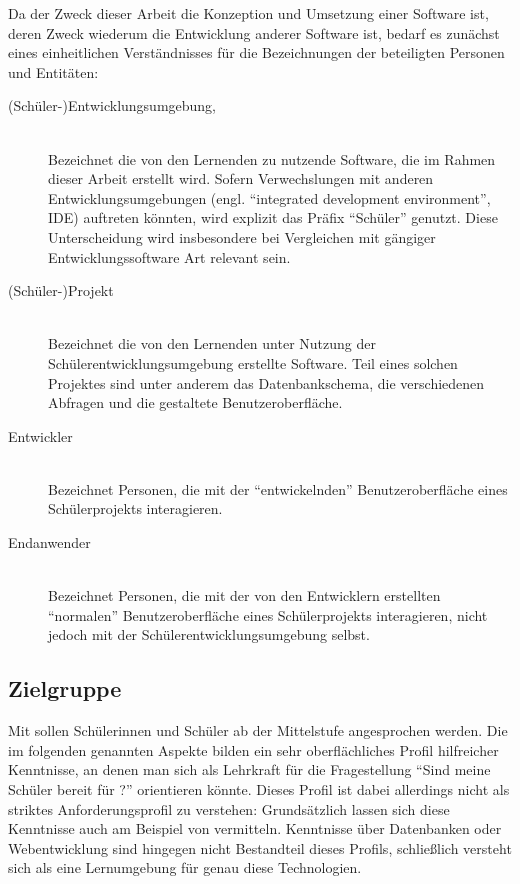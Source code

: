 Da der Zweck dieser Arbeit die Konzeption und Umsetzung einer Software ist, deren Zweck wiederum die Entwicklung anderer Software ist, bedarf es zunächst eines einheitlichen Verständnisses für die Bezeichnungen der beteiligten Personen und Entitäten:

\begin{description}
\item[(Schüler-)Entwicklungsumgebung, \idename{}] \hfill\\
  Bezeichnet die von den Lernenden zu nutzende Software, die im Rahmen dieser Arbeit erstellt wird. Sofern Verwechslungen mit anderen Entwicklungsumgebungen (engl. ``integrated development environment'', IDE) auftreten könnten, wird explizit das Präfix ``Schüler'' genutzt. Diese Unterscheidung wird insbesondere bei Vergleichen mit gängiger Entwicklungssoftware Art relevant sein.
\item[(Schüler-)Projekt] \hfill\\
  Bezeichnet die von den Lernenden unter Nutzung der Schülerentwicklungsumgebung erstellte Software. Teil eines solchen Projektes sind unter anderem das Datenbankschema, die verschiedenen Abfragen und die gestaltete Benutzeroberfläche.
\item[Entwickler] \hfill\\
  Bezeichnet Personen, die mit der ``entwickelnden'' Benutzeroberfläche eines Schülerprojekts interagieren.
\item[Endanwender] \hfill\\
  Bezeichnet Personen, die mit der von den Entwicklern erstellten ``normalen'' Benutzeroberfläche eines Schülerprojekts interagieren, nicht jedoch mit der Schülerentwicklungsumgebung selbst.
\end{description}

\subsection{Zielgruppe}
\label{sec:target-audience}

Mit \idename{} sollen Schülerinnen und Schüler ab der Mittelstufe angesprochen werden. Die im folgenden genannten Aspekte bilden ein sehr oberflächliches Profil hilfreicher Kenntnisse, an denen man sich als Lehrkraft für die Fragestellung "`Sind meine Schüler bereit für \idename{}?"' orientieren könnte. Dieses Profil ist dabei allerdings nicht als striktes Anforderungsprofil zu verstehen: Grundsätzlich lassen sich diese Kenntnisse auch am Beispiel von \idename{} vermitteln. Kenntnisse über Datenbanken oder Webentwicklung sind hingegen nicht Bestandteil dieses Profils, schließlich versteht sich \idename{} als eine Lernumgebung für genau diese Technologien.

